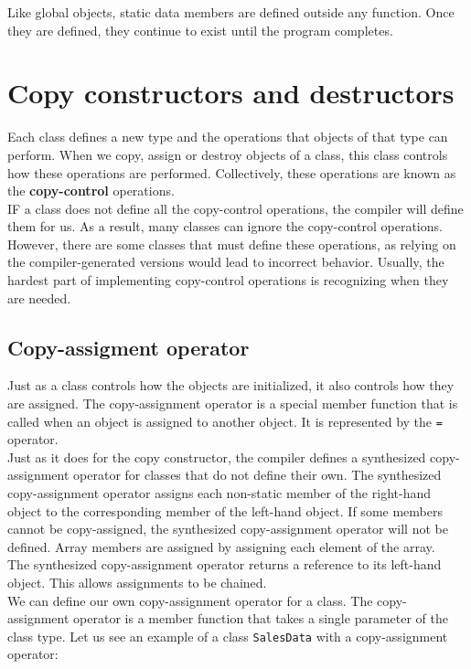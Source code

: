 Like global objects, static data members are defined outside any function. Once they are defined, they
continue to exist until the program completes.

\section{Copy constructors and destructors}

Each class defines a new type and the operations that objects of that type can perform.
When we copy, assign or destroy objects of a class, this class controls how these operations
are performed. Collectively, these operations are known as the \textbf{copy-control} operations.\\

IF a class does not define all the copy-control operations, the compiler will define them for us.
As a result, many classes can ignore the copy-control operations. However, there are some classes
that must define these operations, as relying on the compiler-generated versions would lead to
incorrect behavior. Usually, the hardest part of implementing copy-control operations is 
recognizing when they are needed.

\subsection{Copy-assigment operator}

Just as a class controls how the objects are initialized, it also controls how they are assigned.
The copy-assignment operator is a special member function that is called when an object 
is assigned to another object. It is represented by the \texttt{=} operator.\\

Just as it does for the copy constructor, the compiler defines a synthesized copy-assignment
operator for classes that do not define their own. The synthesized copy-assignment operator
assigns each non-static member of the right-hand object to the corresponding member of the
left-hand object. If some members cannot be copy-assigned, the synthesized copy-assignment operator
will not be defined. Array members are assigned by assigning each element of the array.\\

The synthesized copy-assignment operator returns a reference to its left-hand object. This allows
assignments to be chained.\\

We can define our own copy-assignment operator for a class. The copy-assignment operator is a member
function that takes a single parameter of the class type. Let us see an example of a class 
\texttt{SalesData} with a copy-assignment operator:\\

